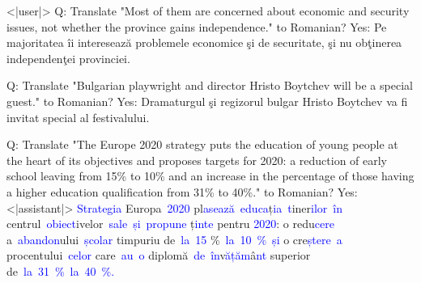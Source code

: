 \documentclass{article}
\begin{document}
\begin{tcolorbox}[colframe=black,colback=white]
<|user|>
Q: Translate "Most of them are concerned about economic and security issues, not whether the province gains independence." to Romanian?
Yes: Pe majoritatea îi interesează problemele economice şi de securitate, şi nu obţinerea independenţei provinciei.

Q: Translate "Bulgarian playwright and director Hristo Boytchev will be a special guest." to Romanian?
Yes: Dramaturgul şi regizorul bulgar Hristo Boytchev va fi invitat special al festivalului.

Q: Translate "The Europe 2020 strategy puts the education of young people at the heart of its objectives and proposes targets for 2020: a reduction of early school leaving from 15\% to 10\% and an increase in the percentage of those having a higher education qualification from 31\% to 40\%." to Romanian?
Yes:
<|assistant|>
\textcolor{blue}{Str}\textcolor{blue}{ateg}\textcolor{blue}{ia} Europa\textcolor{blue}{~}\textcolor{blue}{202}\textcolor{blue}{0} pl\textcolor{blue}{ase}\textcolor{blue}{ază}\textcolor{blue}{~edu}\textcolor{blue}{ca}ț\textcolor{blue}{ia}\textcolor{blue}{~t}iner\textcolor{blue}{ilor}\textcolor{blue}{~în} centrul\textcolor{blue}{~ob}\textcolor{blue}{iect}ivelor\textcolor{blue}{~sale}\textcolor{blue}{~și}\textcolor{blue}{~prop}\textcolor{blue}{une} ț\textcolor{blue}{inte} pentru \textcolor{blue}{202}\textcolor{blue}{0}: o redu\textcolor{blue}{c}\textcolor{blue}{ere} a\textcolor{blue}{~abandon}ului\textcolor{blue}{~}\textcolor{blue}{ș}\textcolor{blue}{col}\textcolor{blue}{ar} timpuriu de\textcolor{blue}{~la}\textcolor{blue}{~}\textcolor{blue}{15} \%\textcolor{blue}{~la}\textcolor{blue}{~}\textcolor{blue}{10}\textcolor{blue}{~\%}\textcolor{blue}{~și} o cre\textcolor{blue}{ș}\textcolor{blue}{tere}\textcolor{blue}{~a} procentului\textcolor{blue}{~cel}\textcolor{blue}{or} care\textcolor{blue}{~au}\textcolor{blue}{~o} diplomă\textcolor{blue}{~de}\textcolor{blue}{~în}v\textcolor{blue}{ă}\textcolor{blue}{ț}\textcolor{blue}{ăm}â\textcolor{blue}{nt} superior de\textcolor{blue}{~la}\textcolor{blue}{~}\textcolor{blue}{31}\textcolor{blue}{~\%}\textcolor{blue}{~la}\textcolor{blue}{~}\textcolor{blue}{40}\textcolor{blue}{~\%.}\textcolor{blue}{}
\end{tcolorbox}
\end{document}
